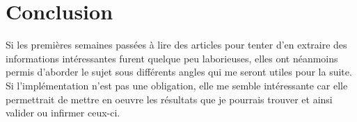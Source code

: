 \documentclass[a4paper,12pt]{article}
\begin{document}
\section{Conclusion}

Si les premières semaines passées à lire des articles pour tenter
d'en extraire des informations intéressantes furent quelque peu 
laborieuses, elles ont néanmoins permis d'aborder le sujet sous différents
angles qui me seront utiles pour la suite. Si l'implémentation n'est pas
une obligation, elle me semble intéressante car elle permettrait de mettre
en oeuvre les résultats que je pourrais trouver et ainsi valider ou infirmer
ceux-ci. 
\end{document}
